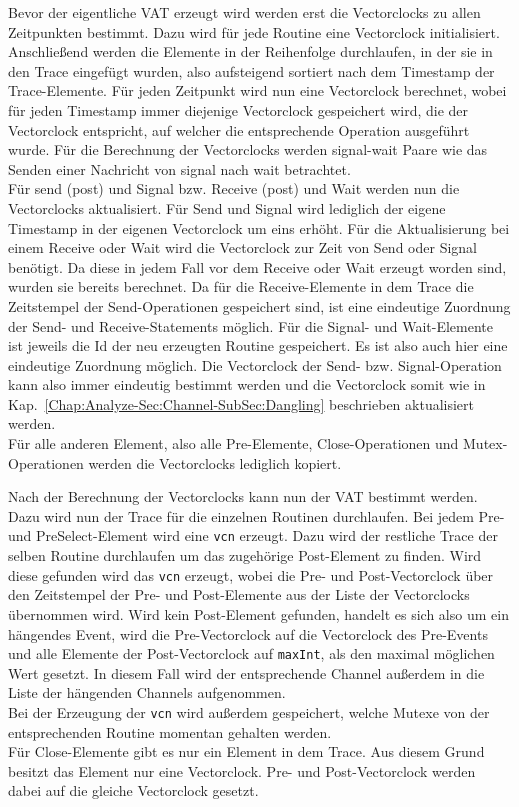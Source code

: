 Bevor der eigentliche VAT erzeugt wird werden erst die Vectorclocks zu allen
Zeitpunkten bestimmt. Dazu wird für jede Routine eine Vectorclock initialisiert. 
Anschließend werden die Elemente in der Reihenfolge durchlaufen, in der sie 
in den Trace eingefügt wurden, also aufsteigend sortiert nach dem Timestamp 
der Trace-Elemente. Für jeden Zeitpunkt wird nun eine Vectorclock berechnet,
wobei für jeden Timestamp immer diejenige Vectorclock gespeichert wird, die 
der Vectorclock entspricht, auf welcher die entsprechende Operation ausgeführt wurde.
Für die Berechnung der Vectorclocks werden signal-wait Paare wie das Senden 
einer Nachricht von signal nach wait betrachtet.\\
Für send (post) und Signal bzw. Receive (post) und Wait werden nun die Vectorclocks 
aktualisiert.
Für Send und Signal wird lediglich der eigene Timestamp in der eigenen 
Vectorclock um eins erhöht. Für die Aktualisierung bei einem Receive oder Wait 
wird die Vectorclock zur Zeit von Send oder Signal benötigt. Da diese in jedem 
Fall vor dem Receive oder Wait erzeugt worden sind, wurden sie bereits berechnet.
Da für die Receive-Elemente in dem Trace die Zeitstempel der Send-Operationen 
gespeichert sind, ist eine eindeutige Zuordnung der Send- und Receive-Statements 
möglich. Für die Signal- und Wait-Elemente ist jeweils die Id der neu erzeugten 
Routine gespeichert. Es ist also auch hier eine eindeutige Zuordnung möglich. 
Die Vectorclock der Send- bzw. Signal-Operation kann also immer eindeutig bestimmt 
werden und die Vectorclock somit wie in Kap.~\ref{Chap:Analyze-Sec:Channel-SubSec:Dangling}
beschrieben aktualisiert werden.\\
Für alle anderen Element, also alle Pre-Elemente, Close-Operationen und Mutex-Operationen 
werden die Vectorclocks lediglich kopiert.

Nach der Berechnung der Vectorclocks kann nun der VAT bestimmt werden. 
Dazu wird nun der Trace für die einzelnen Routinen durchlaufen. Bei jedem 
Pre- und PreSelect-Element wird eine \texttt{vcn} erzeugt. Dazu wird der restliche Trace 
der selben Routine durchlaufen um das zugehörige Post-Element zu finden. 
Wird diese gefunden wird 
das \texttt{vcn} erzeugt, wobei die Pre- und Post-Vectorclock über den 
Zeitstempel der Pre- und Post-Elemente aus der Liste der Vectorclocks 
übernommen wird.
Wird kein Post-Element gefunden, handelt es sich also um ein hängendes Event, 
wird die Pre-Vectorclock auf die Vectorclock des Pre-Events und alle Elemente 
der Post-Vectorclock auf \texttt{maxInt}, als den maximal möglichen Wert 
gesetzt. In diesem Fall wird der entsprechende Channel außerdem in die Liste der
hängenden Channels aufgenommen.\\
Bei der Erzeugung der \texttt{vcn} wird außerdem gespeichert, welche Mutexe 
von der entsprechenden Routine momentan gehalten werden.     
\\
Für Close-Elemente gibt es nur ein Element in dem Trace. Aus diesem Grund 
besitzt das Element nur eine Vectorclock. Pre- und Post-Vectorclock werden 
dabei auf die gleiche Vectorclock gesetzt.

